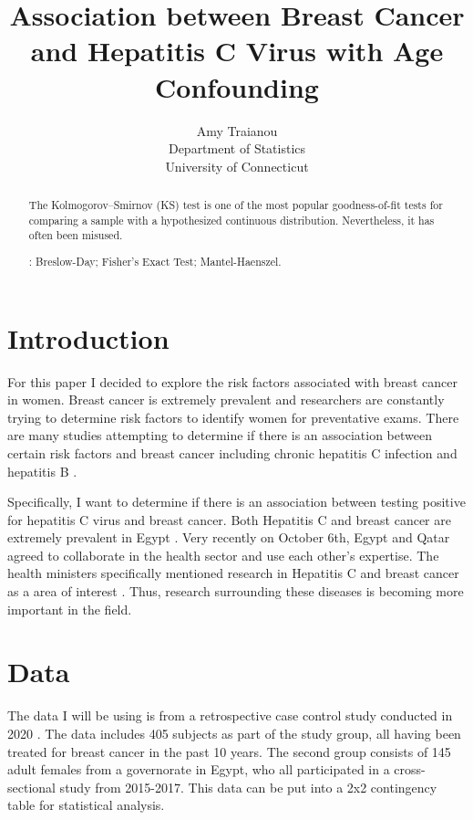 \documentclass[12pt, titlepage]{article}
\title{Association between Breast Cancer and Hepatitis C Virus with Age Confounding}
\author{Amy Traianou\\
  Department of Statistics\\
  University of Connecticut
}
\begin{document}
\maketitle


\begin{abstract}
The Kolmogorov--Smirnov (KS) test is one of the most popular goodness-of-fit
tests for comparing a sample with a hypothesized continuous distribution.
Nevertheless, it has often been misused.


\bigskip
{}:
Breslow-Day;
Fisher's Exact Test;
Mantel-Haenszel.
\end{abstract}


\section{Introduction}
\label{sec:intro}

For this paper I decided to explore the risk factors associated with breast cancer in women. Breast cancer is extremely
prevalent and researchers are constantly trying to determine risk factors to identify women for preventative exams.
There are many studies attempting to determine if there is an association between certain risk factors and 
breast cancer including chronic hepatitis C infection \citep{Larrey2010is} and hepatitis B \citep{vishnu2016does}. 

Specifically, I want to determine if there is an association between testing positive for hepatitis C virus
and breast cancer. Both Hepatitis C and breast cancer are extremely prevalent in Egypt \citep{Hussein2021high}. 
Very recently on October 6th, Egypt and Qatar agreed to collaborate in the health sector and use each 
other's expertise. The health ministers specifically mentioned research in Hepatitis C and breast cancer
as a area of interest \citep{arham2022egypt}. Thus, research surrounding these diseases is becoming more
important in the field. 



\section{Data}
\label{sec:data}

The data I will be using is from a retrospective case control study conducted in 2020 \citep{2020association}. 
The data includes 405 subjects as part of the study group, all having been treated for breast cancer in the 
past 10 years. The second group consists of 145 adult females from a governorate in Egypt, who all participated 
in a cross-sectional study from 2015-2017. This data can be put into a 2x2 contingency table
for statistical analysis. 
\end{document}
